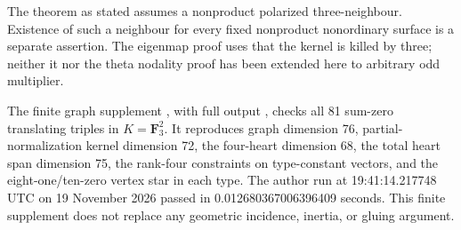 \begin{remark}
\label{rem:nonordinary-degree-three-neighbour-scope-candidate}
The theorem as stated assumes a nonproduct polarized three-neighbour.
Existence of such a neighbour for every fixed nonproduct nonordinary
surface is a separate assertion. The eigenmap proof uses that the
kernel is killed by three; neither it nor the theta nodality proof
has been extended here to arbitrary odd multiplier.

The finite graph supplement
, with
full output
,
checks all 81 sum-zero translating triples in $K=\mathbf F_3^2$.
It reproduces graph dimension 76, partial-normalization kernel
dimension 72, the four-heart dimension 68, the total heart span
dimension 75, the rank-four constraints on type-constant vectors,
and the eight-one/ten-zero vertex star in each type. The author
run at 19:41:14.217748 UTC on 19 November 2026 passed in
0.012680367006396409 seconds. This finite supplement does not
replace any geometric incidence, inertia, or gluing argument.
\end{remark}
